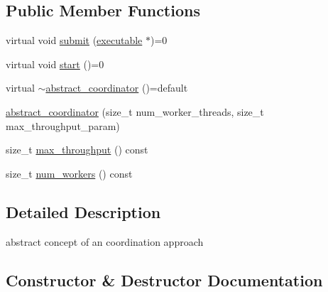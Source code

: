 \subsection*{Public Member Functions}
\begin{DoxyCompactItemize}
\item 
virtual void \hyperlink{classactor__zeta_1_1executor_1_1abstract__coordinator_a4e9c6ebc0d950993e051a6f512539dfa}{submit} (\hyperlink{structactor__zeta_1_1executor_1_1executable}{executable} $\ast$)=0
\item 
virtual void \hyperlink{classactor__zeta_1_1executor_1_1abstract__coordinator_abbbe1a84649a3ae2cfcb60c7728b2944}{start} ()=0
\item 
virtual \hyperlink{classactor__zeta_1_1executor_1_1abstract__coordinator_a3168a7bb00a6499f2ec0ab33e7682fd1}{$\sim$abstract\+\_\+coordinator} ()=default
\item 
\hyperlink{classactor__zeta_1_1executor_1_1abstract__coordinator_a52f408cbdd6b33f33a02eb3b288c9247}{abstract\+\_\+coordinator} (size\+\_\+t num\+\_\+worker\+\_\+threads, size\+\_\+t max\+\_\+throughput\+\_\+param)
\item 
size\+\_\+t \hyperlink{classactor__zeta_1_1executor_1_1abstract__coordinator_aeb428a4c165e5d01ff7e7c93d9404d11}{max\+\_\+throughput} () const
\item 
size\+\_\+t \hyperlink{classactor__zeta_1_1executor_1_1abstract__coordinator_a50c97e6b0508fe609e0ca62a7da3ee96}{num\+\_\+workers} () const
\end{DoxyCompactItemize}


\subsection{Detailed Description}
abstract concept of an coordination approach 

\subsection{Constructor \& Destructor Documentation}
\mbox{\label{classactor__zeta_1_1executor_1_1abstract__coordinator_a3168a7bb00a6499f2ec0ab33e7682fd1}} 
